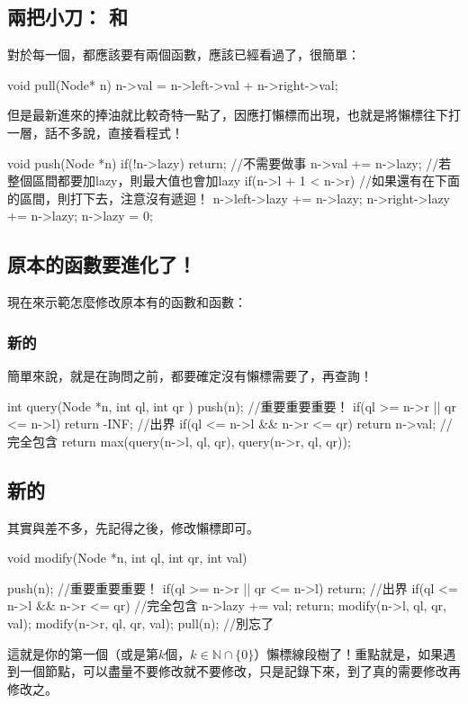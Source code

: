			\subsection{兩把小刀： 和 }
				對於每一個，都應該要有兩個函數，應該已經看過了，很簡單：
				\begin{C++}
void pull(Node* n){
	n->val = n->left->val + n->right->val;
}
				\end{C++}
				但是最新進來的捧油就比較奇特一點了，因應打懶標而出現，也就是將懶標往下打一層，話不多說，直接看程式！
				\begin{C++}
void push(Node *n){
	if(!n->lazy) return; //不需要做事
	n->val += n->lazy; //若整個區間都要加lazy，則最大值也會加lazy
	if(n->l + 1 < n->r){ //如果還有在下面的區間，則打下去，注意沒有遞迴！
		n->left->lazy += n->lazy;
		n->right->lazy += n->lazy;
	}
	n->lazy = 0;
}
				\end{C++}
	\subsection{原本的函數要進化了！}
		現在來示範怎麼修改原本有的函數和函數：
		\subsubsection{新的}
			簡單來說，就是在詢問之前，都要確定沒有懶標需要了，再查詢！
			\begin{C++}
int query(Node *n, int ql, int qr ){
	push(n); //重要重要重要！
	if(ql >= n->r || qr <= n->l) return -INF; //出界
	if(ql <= n->l && n->r <= qr) return n->val; //完全包含
	return max(query(n->l, ql, qr), query(n->r, ql, qr));
}
			\end{C++}
		\subsection{新的}
			其實與差不多，先記得之後，修改懶標即可。
			\begin{C++}
void modify(Node *n, int ql, int qr, int val){
	push(n); //重要重要重要！
	if(ql >= n->r || qr <= n->l) return; //出界
	if(ql <= n->l && n->r <= qr){ //完全包含
		n->lazy += val; 
		return;
	}
	modify(n->l, ql, qr, val); 
	modify(n->r, ql, qr, val);
	pull(n); //別忘了
	
}
			\end{C++}
		這就是你的第一個（或是第$k$個，$k \in \mathbb{N} \cap \{0\}$）懶標線段樹了！重點就是，如果遇到一個節點，可以盡量不要修改就不要修改，只是記錄下來，到了真的需要修改再修改之。
